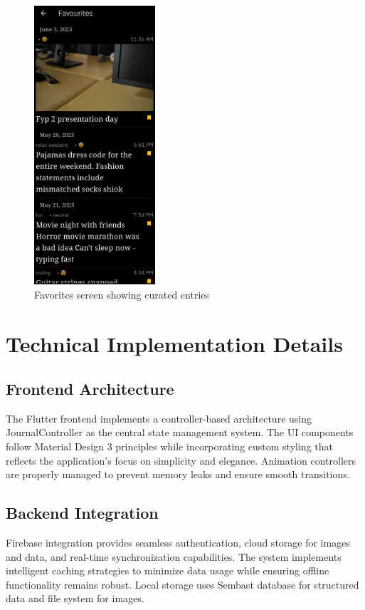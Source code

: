 \begin{figure}[H]
\centering
\includegraphics[width=0.4\textwidth]{files/imgs/prototype/favorites_screen.jpeg}
\caption{Favorites screen showing curated entries}
\label{fig:favorites-screen}
\end{figure}

\section{Technical Implementation Details}

\subsection{Frontend Architecture}

The Flutter frontend implements a controller-based architecture using JournalController as the central state management system. The UI components follow Material Design 3 principles while incorporating custom styling that reflects the application's focus on simplicity and elegance. Animation controllers are properly managed to prevent memory leaks and ensure smooth transitions.

\subsection{Backend Integration}

Firebase integration provides seamless authentication, cloud storage for images and data, and real-time synchronization capabilities. The system implements intelligent caching strategies to minimize data usage while ensuring offline functionality remains robust. Local storage uses Sembast database for structured data and file system for images.

